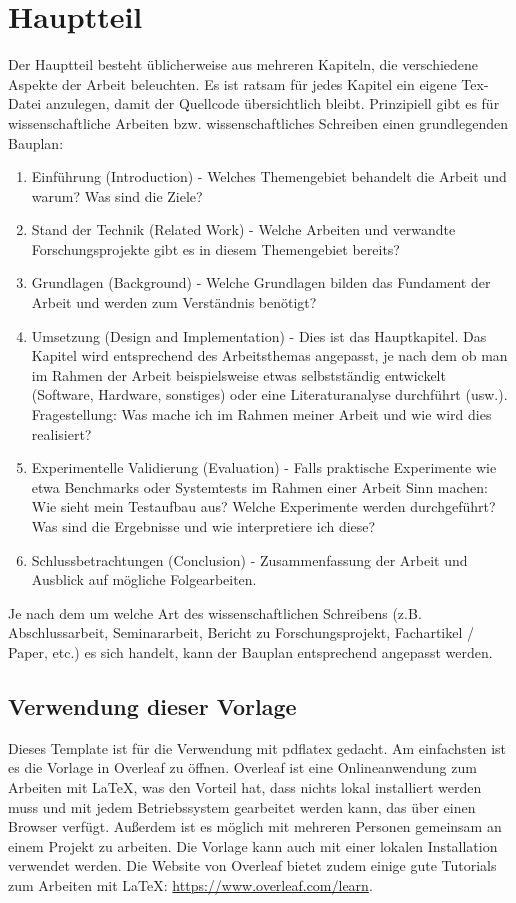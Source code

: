 \chapter{Hauptteil}
Der Hauptteil besteht üblicherweise aus mehreren Kapiteln, die verschiedene Aspekte der Arbeit beleuchten. Es ist ratsam für jedes Kapitel ein eigene Tex-Datei anzulegen, damit der Quellcode übersichtlich bleibt. Prinzipiell gibt es für wissenschaftliche Arbeiten bzw. wissenschaftliches Schreiben einen grundlegenden \glqq Bauplan\grqq{}:
\begin{enumerate}
    \item Einführung (Introduction) - Welches Themengebiet behandelt die Arbeit und warum? Was sind die Ziele?
    \item Stand der Technik (Related Work) - Welche Arbeiten und verwandte Forschungsprojekte gibt es in diesem Themengebiet bereits?
    \item Grundlagen (Background) - Welche Grundlagen bilden das Fundament der Arbeit und werden zum Verständnis benötigt?
    \item Umsetzung (Design and Implementation) - Dies ist das Hauptkapitel. Das Kapitel wird entsprechend des Arbeitsthemas angepasst, je nach dem ob man im Rahmen der Arbeit beispielsweise etwas selbstständig entwickelt (Software, Hardware, sonstiges) oder eine Literaturanalyse durchführt (usw.). Fragestellung: Was mache ich im Rahmen meiner Arbeit und wie wird dies realisiert?
    \item Experimentelle Validierung (Evaluation) - Falls praktische Experimente wie etwa Benchmarks oder Systemtests im Rahmen einer Arbeit Sinn machen: Wie sieht mein Testaufbau aus? Welche Experimente werden durchgeführt? Was sind die Ergebnisse und wie interpretiere ich diese?
    \item Schlussbetrachtungen (Conclusion) - Zusammenfassung der Arbeit und Ausblick auf mögliche Folgearbeiten.
\end{enumerate}
Je nach dem um welche Art des wissenschaftlichen Schreibens (z.B. Abschlussarbeit, Seminararbeit, Bericht zu Forschungsprojekt, Fachartikel / Paper, etc.) es sich handelt, kann der \glqq Bauplan\grqq{} entsprechend angepasst werden.

\section{Verwendung dieser Vorlage}
Dieses Template ist für die Verwendung mit pdflatex gedacht. Am einfachsten ist es die Vorlage in Overleaf \cite{overleaf} zu öffnen. Overleaf ist eine Onlineanwendung zum Arbeiten mit \LaTeX{}, was den Vorteil hat, dass nichts lokal installiert werden muss und mit jedem Betriebssystem gearbeitet werden kann, das über einen Browser verfügt. Außerdem ist es möglich mit mehreren Personen gemeinsam an einem Projekt zu arbeiten. Die Vorlage kann auch mit einer lokalen Installation verwendet werden. Die Website von Overleaf bietet zudem einige gute Tutorials zum Arbeiten mit \LaTeX{}: \url{https://www.overleaf.com/learn}.

